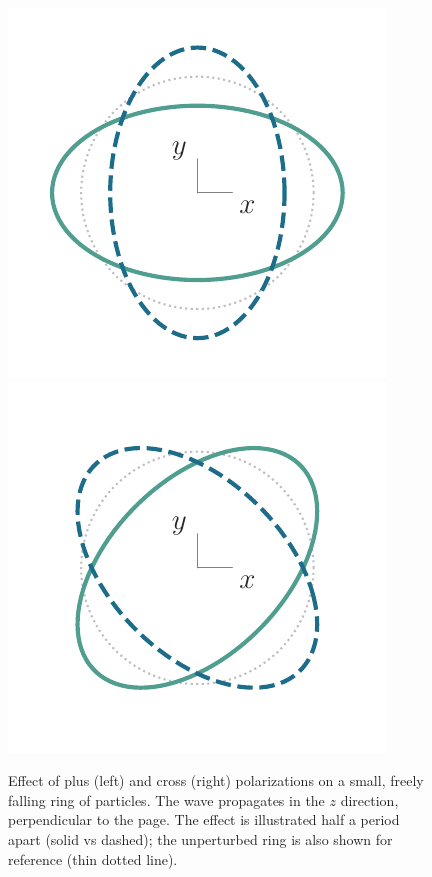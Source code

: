 \documentclass[aps,prd,twocolumn,superscriptaddress,preprintnumbers,floatfix,nofootinbib]{revtex4-2}
\newcommand*{\eq}[1]{Eq.~\eqref{eq:#1}}
\begin{document}
\begin{figure}
\includegraphics[width=0.4\columnwidth]{pol_ring_plus}
\includegraphics[width=0.4\columnwidth]{pol_ring_cross}
\caption{Effect of plus (left) and cross (right) polarizations on a small, freely falling ring of particles. The wave propagates in the $z$ direction, perpendicular to the page. The effect is illustrated half a period apart (solid vs dashed); the unperturbed ring is also shown for reference (thin dotted line).
}
\label{fig:rings}
\end{figure}

\end{document}
